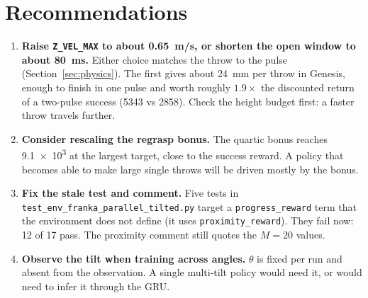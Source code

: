 \documentclass[10.5pt,a4paper]{article}
\newcommand{\code}[1]{\texttt{#1}}
\begin{document}
\section{Recommendations}
\begin{enumerate}
\item \textbf{Raise \code{Z\_VEL\_MAX} to about \SI{0.65}{m/s}, or shorten the open window to about
\SI{80}{ms}.} Either choice matches the throw to the pulse (Section~\ref{sec:physics}). The first gives about
\SI{24}{mm} per throw in Genesis, enough to finish in one pulse and worth roughly $1.9\times$ the discounted
return of a two-pulse success (5343 vs 2858). Check the height budget first: a faster throw travels further.
\item \textbf{Consider rescaling the regrasp bonus.} The quartic bonus reaches \SI{9.1e3}{} at the largest
target, close to the success reward. A policy that becomes able to make large single throws will be driven
mostly by the bonus.
\item \textbf{Fix the stale test and comment.} Five tests in \code{test\_env\_franka\_parallel\_tilted.py} target a
\code{progress\_reward} term that the environment does not define (it uses \code{proximity\_reward}). They fail
now: 12 of 17 pass. The proximity comment still quotes the $M=20$ values.
\item \textbf{Observe the tilt when training across angles.} $\theta$ is fixed per run and absent from the
observation. A single multi-tilt policy would need it, or would need to infer it through the GRU.
\end{enumerate}

\appendix
\end{document}
